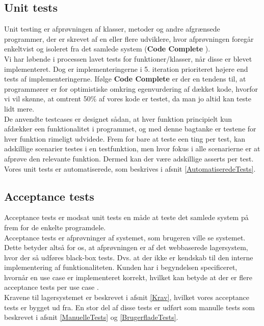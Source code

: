 \documentclass[]{article}
\begin{document}
\subsection{Unit tests}
Unit testing er afprøvningen af klasser, metoder og andre afgrænsede programmer, der er skrevet af en eller flere udviklere, hvor afprøvningen foregår enkeltvist og isoleret fra det samlede system (\textbf{Code Complete} \cite{mcconnell2004code}). \\
Vi har løbende i processen lavet tests for funktioner/klasser, når disse er blevet implementeret. Dog er implementeringerne i 5. iteration prioriteret højere end tests af implementeringerne. Ifølge \textbf{Code Complete} \cite{mcconnell2004code} er der en tendens til, at programmører er for optimistiske omkring egenvurdering af dækket kode, hvorfor vi vil skønne, at omtrent 50\% af vores kode er testet, da man jo altid kan teste lidt mere. \\
\indent De anvendte testcases er designet sådan, at hver funktion principielt kun afdækker een funktionalitet i programmet, og med denne bagtanke er testene for hver funktion rimeligt udvidede. Frem for bare at teste een ting per test, kan adskillige scenarier testes i en testfunktion, men hvor fokus i alle scenarierne er at afprøve den relevante funktion. Dermed kan der være adskillige asserts per test. Vores unit tests er automatiserede, som beskrives i afsnit \ref{AutomatiseredeTests}.

\subsection{Acceptance tests}
Acceptance tests er modsat unit tests en måde at teste det samlede system på frem for de enkelte programdele. \\
Acceptance tests er afprøvninger af systemet, som brugeren ville se systemet. Dette betyder altså for os, at afprøvningen er af det webbaserede lagersystem, hvor der så udføres black-box tests. Dvs. at der ikke er kendskab til den interne implementering af funktionaliteten. Kunden har i begyndelsen specificeret, hvornår en use case er implementeret korrekt, hvilket kan betyde at der er flere acceptance tests per use case \cite{martin2006agile,mcconnell2004code}. \\
Kravene til lagersystemet er beskrevet i afsnit \ref{Krav}, hvilket vores acceptance tests er bygget ud fra. En stor del af disse tests er udført som manulle tests som beskrevet i afsnit \ref{ManuelleTests} og \ref{BrugerfladeTests}.
\end{document}
